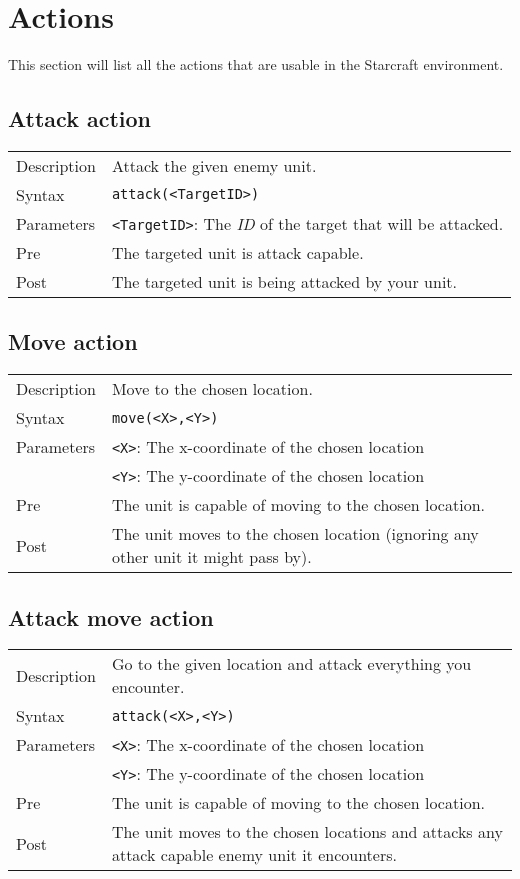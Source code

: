\chapter{Actions}
This section will list all the actions that are usable in the Starcraft environment.

\section{Attack action}
\begin{tabularx}{\textwidth}{lX}
 Description & Attack the given enemy unit. \\
 Syntax & \verb|attack(<TargetID>)| \\
 Parameters & \verb|<TargetID>|: The \textit{ID} of the target that will be attacked.\\
 Pre & The targeted unit is attack capable. \\
 Post &  The targeted unit is being attacked by your unit.
\end{tabularx}

\section{Move action}
\begin{tabularx}{\textwidth}{lX}
 Description & Move to the chosen location. \\
 Syntax & \verb|move(<X>,<Y>)| \\
 Parameters & \verb|<X>|: The x-coordinate of the chosen location \\
            &  \verb|<Y>|: The y-coordinate of the chosen location \\
 Pre & The unit is capable of moving to the chosen location. \\
 Post & The unit moves to the chosen location (ignoring any other unit it might pass by).
\end{tabularx}

\section{Attack move action}
\begin{tabularx}{\textwidth}{lX}
 Description & Go to the given location and attack everything you encounter. \\
 Syntax & \verb|attack(<X>,<Y>)| \\
 Parameters & \verb|<X>|: The x-coordinate of the chosen location \\
            & \verb|<Y>|: The y-coordinate of the chosen location \\
 Pre & The unit is capable of moving to the chosen location. \\
 Post & The unit moves to the chosen locations and attacks any attack capable enemy unit it encounters.
\end{tabularx}

